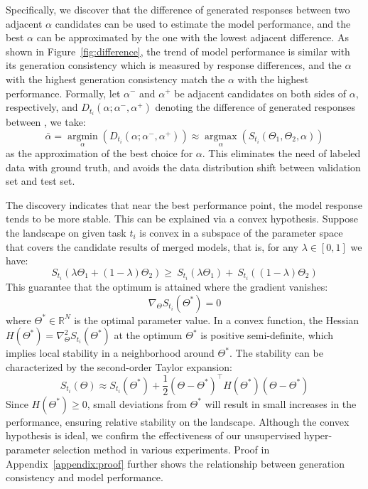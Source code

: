 Specifically, we discover that the difference of generated responses between two adjacent $\alpha$ candidates can be used to estimate the model performance, and the best $\alpha$ can be approximated by the one with the lowest adjacent difference. 
As shown in Figure~\ref{fig:difference}, the trend of model performance is similar with its generation consistency which is measured by response differences, and the $\alpha$ with the highest generation consistency match the $\alpha$ with the highest performance.
Formally, let $\alpha^-$ and $\alpha^+$ be adjacent candidates on both sides of $\alpha$, respectively, and $D_{t_i}(\alpha; \alpha^-, \alpha^+)$ denoting the difference of generated responses between , we take:
\[
\bar{\alpha} = \operatorname*{argmin}_{\alpha}(D_{t_i}(\alpha; \alpha^-, \alpha^+)) \approx \operatorname*{argmax}_{\alpha}(S_{t_i}(\Theta_1, \Theta_2, \alpha))
\]
as the approximation of the best choice for $\alpha$. This eliminates the need of labeled data with ground truth, and avoids the data distribution shift between validation set and test set. 

The discovery indicates that near the best performance point, the model response tends to be more stable. This can be explained via a convex hypothesis. Suppose the landscape on given task $t_i$ is convex in a subspace of the parameter space that covers the candidate results of merged models, that is, for any $\lambda \in [0,1]$ we have:
\begin{equation*}
    S_{t_i}(\lambda\Theta_1+(1-\lambda)\Theta_2) \geq \
     S_{t_i}(\lambda\Theta_1) + \
      S_{t_i}((1-\lambda)\Theta_2)
\end{equation*}
This guarantee that the optimum is attained where the gradient vanishes:
\begin{equation*}
    \nabla_{\Theta}S_{t_i}(\Theta^*) = 0
\end{equation*}
where $\Theta^* \in \mathbb{R}^N$ is the optimal parameter value. In a convex function, the Hessian $H(\Theta^*)=\nabla^2_{\Theta}S_{t_i}(\Theta^*)$ at the optimum $\Theta^*$ is positive semi-definite, which implies local stability in a neighborhood around $\Theta^*$. The stability can be characterized by the second-order Taylor expansion:
\begin{equation*}
    S_{t_i}(\Theta) \approx S_{t_i}(\Theta^*) + \frac{1}{2}(\Theta-\Theta^*)^{\top}H(\Theta^*)(\Theta-\Theta^*)
\end{equation*}
Since $H(\Theta^*) \geq 0$, small deviations from $\Theta^*$ will result in small increases in the performance, ensuring relative stability on the landscape. Although the convex hypothesis is ideal, we confirm the effectiveness of our unsupervised hyper-parameter selection method in various experiments.
Proof in Appendix~\ref{appendix:proof} further shows the relationship between generation consistency and model performance.

